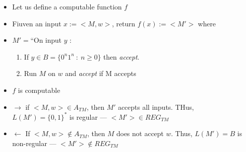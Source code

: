 \documentclass[12pt,a4paper]{article}
\newcommand{\atm}{\ensuremath{A_{TM}} }
\newcommand{\reg}{\ensuremath{REG_{TM}} }
\newcommand{\<}{\langle}
\renewcommand{\>}{\rangle}
\begin{document}
\begin{itemize}
        \item Let us define a computable function $f$
        \item Fiuven an input $x := <M,w>$, return $f(x) := <M'>$ where
        \item $M' =$``On input $y$ :
                \begin{enumerate}
                    \item If $y \in B = \{0^n1^n\ : \ n \geq 0\}$ then \textit{accept}.
                    \item Run $M$ on $w$ and \textit{accept} if M accepts
                \end{enumerate}
        \item $f$ is computable
        \item $\to$ if $<M,w> \in \atm$, then $M'$ accepts all inputs. THus, $L(M') = \{0,1\}^*$ is regular --- $<M'> \in \reg$
        \item $\leftarrow$ If $<M,w> \notin \atm$, then $M$ does not accept $w$. Thus, $L(M') = B$ is non-regular --- $<M'> \notin \reg$
\end{itemize}
\end{document}
